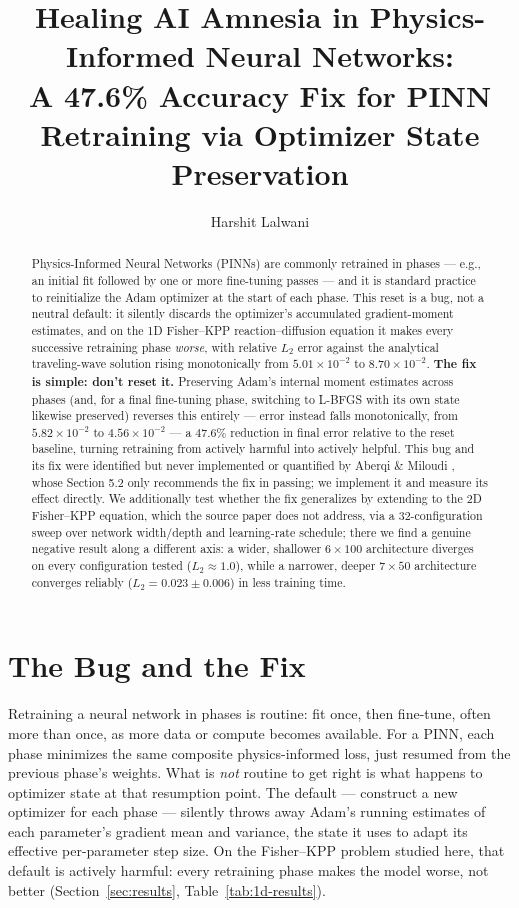\documentclass[11pt]{article}
\title{Healing AI Amnesia in Physics-Informed Neural Networks:\\
\large A 47.6\% Accuracy Fix for PINN Retraining via Optimizer State Preservation}
\author{Harshit Lalwani}
\date{}
\begin{document}
\maketitle

\begin{abstract}
Physics-Informed Neural Networks (PINNs) are commonly retrained in phases --- e.g., an initial fit
followed by one or more fine-tuning passes --- and it is standard practice to reinitialize the Adam
optimizer at the start of each phase. This reset is a bug, not a neutral default: it silently discards
the optimizer's accumulated gradient-moment estimates, and on the 1D Fisher--KPP reaction--diffusion
equation it makes every successive retraining phase \emph{worse}, with relative $L_2$ error against the
analytical traveling-wave solution rising monotonically from $5.01\times10^{-2}$ to $8.70\times10^{-2}$.
\textbf{The fix is simple: don't reset it.} Preserving Adam's internal moment estimates across phases
(and, for a final fine-tuning phase, switching to L-BFGS with its own state likewise preserved) reverses
this entirely --- error instead falls monotonically, from $5.82\times10^{-2}$ to $4.56\times10^{-2}$ ---
a $\mathbf{47.6\%}$ reduction in final error relative to the reset baseline, turning retraining from
actively harmful into actively helpful. This bug and its fix were identified but never implemented or
quantified by Aberqi \& Miloudi \cite{aberqi2026fisher}, whose Section 5.2 only recommends the fix in
passing; we implement it and measure its effect directly. We additionally test whether the fix
generalizes by extending to the 2D Fisher--KPP equation, which the source paper does not address, via a
32-configuration sweep over network width/depth and learning-rate schedule; there we find a genuine
negative result along a different axis: a wider, shallower $6\times100$ architecture diverges on every
configuration tested ($L_2 \approx 1.0$), while a narrower, deeper $7\times50$ architecture converges
reliably ($L_2 = 0.023 \pm 0.006$) in less training time.
\end{abstract}

\section{The Bug and the Fix}

Retraining a neural network in phases is routine: fit once, then fine-tune, often more than once, as
more data or compute becomes available. For a PINN, each phase minimizes the same composite
physics-informed loss, just resumed from the previous phase's weights. What is \emph{not} routine to
get right is what happens to optimizer state at that resumption point. The default --- construct a new
optimizer for each phase --- silently throws away Adam's running estimates of each parameter's gradient
mean and variance, the state it uses to adapt its effective per-parameter step size. On the Fisher--KPP
problem studied here, that default is actively harmful: every retraining phase makes the model worse,
not better (Section~\ref{sec:results}, Table~\ref{tab:1d-results}).
\end{document}
